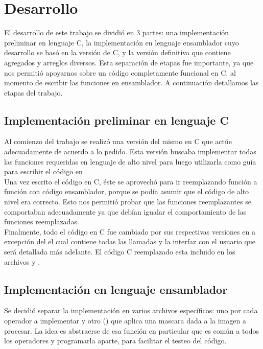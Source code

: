 \section{Desarrollo}
El desarrollo de este trabajo se dividi\'o en 3 partes: una implementaci\'on preliminar en lenguaje C, 
la implementaci\'on en lenguaje ensamblador cuyo desarrollo se bas\'o en la versi\'on de C, y la versi\'on definitiva 
que contiene agregados y arreglos diversos. Esta separaci\'on de etapas fue importante, ya que nos permiti\'o 
apoyarnos sobre un c\'odigo completamente funcional en C,  al momento de escribir las funciones en ensamblador.
A continuaci\'on detallamos las etapas del trabajo.


\subsection{Implementaci\'on preliminar en lenguaje C}
Al comienzo del trabajo se realiz\'o una versi\'on del mismo en C que act\'ue adecuadamente de acuerdo a lo pedido. 
Esta versi\'on buscaba implementar todas las funciones requeridas en lenguaje de alto nivel para luego utilizarla 
como gu\'ia para escribir el c\'odigo en . \\

Una vez escrito el c\'odigo en C, \'este se aprovech\'o para ir reemplazando funci\'on a funci\'on con c\'odigo ensamblador, 
porque se pod\'ia asumir que el c\'odigo de alto nivel era correcto. Esto nos permiti\'o probar que las funciones 
reemplazantes se comportaban adecuadamente ya que deb\'ian igualar el comportamiento de las funciones reemplazadas.\\

Finalmente, todo el c\'odigo en C fue cambiado por sus respectivas versiones en  a excepci\'on del 
 el cual contiene todas las llamadas y la interfaz con el usuario que ser\'a detallada m\'as adelante. 
El c\'odigo C reemplazado esta incluido en los archivos  y .


\subsection{Implementaci\'on en lenguaje ensamblador}
Se decidi\'o separar la implementaci\'on  en varios archivos espec\'ificos: uno por cada operador a 
implementar y otro () que aplica una mascara dada a la imagen a procesar. La idea es 
abstraerse de esa funci\'on en particular que es com\'un a todos los operadores y programarla aparte, para facilitar el 
testeo del c\'odigo.\\

